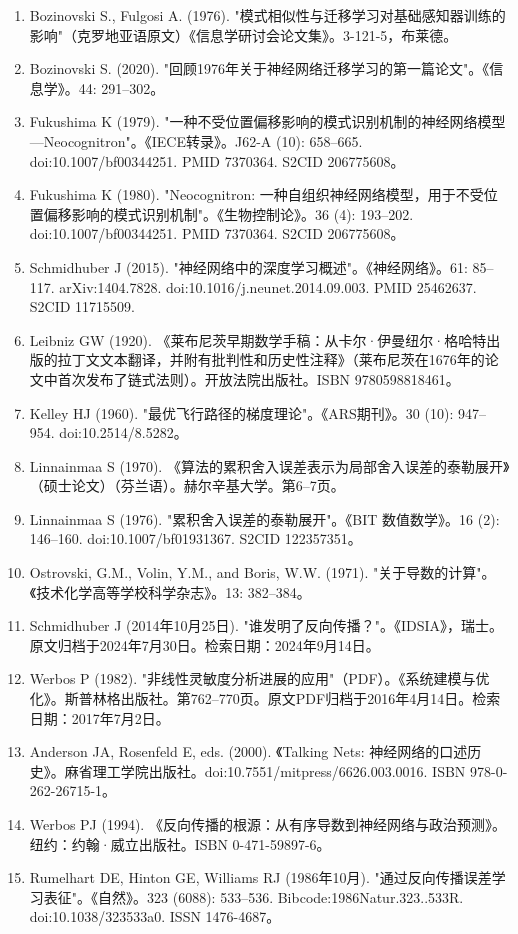 \begin{enumerate}
\item Bozinovski S., Fulgosi A. (1976). "模式相似性与迁移学习对基础感知器训练的影响"（克罗地亚语原文）《信息学研讨会论文集》。3-121-5，布莱德。
\item Bozinovski S. (2020). "回顾1976年关于神经网络迁移学习的第一篇论文"。《信息学》。44: 291–302。
\item Fukushima K (1979). "一种不受位置偏移影响的模式识别机制的神经网络模型—Neocognitron"。《IECE转录》。J62-A (10): 658–665. doi:10.1007/bf00344251. PMID 7370364. S2CID 206775608。
\item Fukushima K (1980). "Neocognitron: 一种自组织神经网络模型，用于不受位置偏移影响的模式识别机制"。《生物控制论》。36 (4): 193–202. doi:10.1007/bf00344251. PMID 7370364. S2CID 206775608。
\item Schmidhuber J (2015). "神经网络中的深度学习概述"。《神经网络》。61: 85–117. arXiv:1404.7828. doi:10.1016/j.neunet.2014.09.003. PMID 25462637. S2CID 11715509.
\item Leibniz GW (1920). 《莱布尼茨早期数学手稿：从卡尔·伊曼纽尔·格哈特出版的拉丁文文本翻译，并附有批判性和历史性注释》（莱布尼茨在1676年的论文中首次发布了链式法则）。开放法院出版社。ISBN 9780598818461。
\item Kelley HJ (1960). "最优飞行路径的梯度理论"。《ARS期刊》。30 (10): 947–954. doi:10.2514/8.5282。
\item Linnainmaa S (1970). 《算法的累积舍入误差表示为局部舍入误差的泰勒展开》（硕士论文）（芬兰语）。赫尔辛基大学。第6–7页。
\item Linnainmaa S (1976). "累积舍入误差的泰勒展开"。《BIT 数值数学》。16 (2): 146–160. doi:10.1007/bf01931367. S2CID 122357351。
\item Ostrovski, G.M., Volin, Y.M., and Boris, W.W. (1971). "关于导数的计算"。《技术化学高等学校科学杂志》。13: 382–384。
\item Schmidhuber J (2014年10月25日). "谁发明了反向传播？"。《IDSIA》，瑞士。原文归档于2024年7月30日。检索日期：2024年9月14日。
\item Werbos P (1982). "非线性灵敏度分析进展的应用"（PDF）。《系统建模与优化》。斯普林格出版社。第762–770页。原文PDF归档于2016年4月14日。检索日期：2017年7月2日。
\item Anderson JA, Rosenfeld E, eds. (2000). 《Talking Nets: 神经网络的口述历史》。麻省理工学院出版社。doi:10.7551/mitpress/6626.003.0016. ISBN 978-0-262-26715-1。
\item Werbos PJ (1994). 《反向传播的根源：从有序导数到神经网络与政治预测》。纽约：约翰·威立出版社。ISBN 0-471-59897-6。
\item Rumelhart DE, Hinton GE, Williams RJ (1986年10月). "通过反向传播误差学习表征"。《自然》。323 (6088): 533–536. Bibcode:1986Natur.323..533R. doi:10.1038/323533a0. ISSN 1476-4687。

\end{enumerate}
